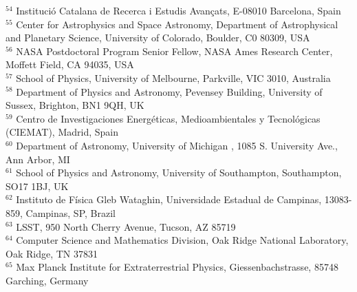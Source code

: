 \documentclass[useAMS,usenatbib,iop,numberedappendix]{mn2e}
\begin{document}
$^{54}$ Instituci\'o Catalana de Recerca i Estudis Avan\c{c}ats, E-08010 Barcelona, Spain\\
$^{55}$ Center for Astrophysics and Space Astronomy, Department of Astrophysical and Planetary Science, University of Colorado, Boulder, C0 80309, USA\\
$^{56}$ NASA Postdoctoral Program Senior Fellow, NASA Ames Research Center, Moffett Field, CA 94035, USA\\
$^{57}$ School of Physics, University of Melbourne, Parkville, VIC 3010, Australia\\
$^{58}$ Department of Physics and Astronomy, Pevensey Building, University of Sussex, Brighton, BN1 9QH, UK\\
$^{59}$ Centro de Investigaciones Energ\'eticas, Medioambientales y Tecnol\'ogicas (CIEMAT), Madrid, Spain\\
$^{60}$ Department of Astronomy, University of Michigan , 1085 S. University Ave., Ann Arbor, MI\\
$^{61}$ School of Physics and Astronomy, University of Southampton,  Southampton, SO17 1BJ, UK\\
$^{62}$ Instituto de F\'isica Gleb Wataghin, Universidade Estadual de Campinas, 13083-859, Campinas, SP, Brazil\\
$^{63}$ LSST, 950 North Cherry Avenue, Tucson, AZ 85719\\
$^{64}$ Computer Science and Mathematics Division, Oak Ridge National Laboratory, Oak Ridge, TN 37831\\
$^{65}$ Max Planck Institute for Extraterrestrial Physics, Giessenbachstrasse, 85748 Garching, Germany\\
\end{document}
